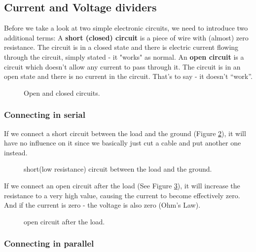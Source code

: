 \subsection{Current and Voltage dividers}
Before we take a look at two simple electronic circuits, we need to introduce
two additional terms: A \textbf{short (closed) circuit} is a piece of wire with
(almost) zero resistance. The circuit is in a closed state and there is
electric current flowing through the circuit, simply stated - it "works" as normal. An \textbf{open
circuit} is a circuit which doesn't allow any current to pass through it. The
circuit is in an open state and there is no current in the circuit. That's to
say - it doesn't ``work''.

\begin{figure}[!ht]
    \centering
    
    \caption{Open and closed circuits.} \label{fig:open_closed_circuits}
\end{figure}

\subsubsection{Connecting in serial}

If we connect a short circuit between the load and the ground (Figure
\ref{fig:circuit1}), it will have no influence on it since we basically just
cut a cable and put another one instead.

\begin{figure}[!ht]
    \centering
    
    \caption{short(low resistance) circuit between the load and the ground.} \label{fig:circuit1}
\end{figure}

If we connect an open circuit after the load (See Figure \ref{fig:circuit2}), it
will increase the resistance to a very high value, causing the current to become
effectively zero. And if the current is zero - the voltage is also zero (Ohm's
Law).

\begin{figure}[!ht]
    \centering
    
    \caption{open circuit after the load.} \label{fig:circuit2}
\end{figure}

\subsubsection{Connecting in parallel}

